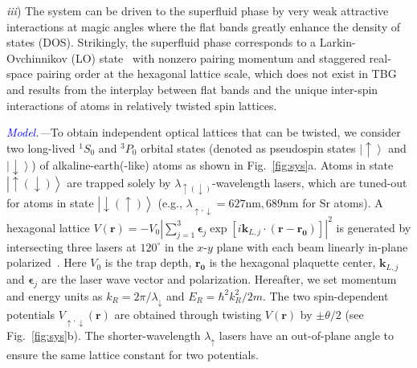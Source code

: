 \documentclass[twocolumn,english,prl,floatfix,citeautoscript,nofootinbib]{revtex4}
\begin{document}
\textit{iii}) The system can be driven to the superfluid phase by very weak
attractive interactions at magic angles where the flat bands greatly enhance
the density of states (DOS). Strikingly, the superfluid phase corresponds to
a Larkin-Ovchinnikov (LO) state~\cite{LO} with nonzero pairing momentum and
staggered real-space pairing order at the hexagonal lattice scale, which
does not exist in TBG and results from the interplay between flat bands and
the unique inter-spin interactions of atoms in relatively twisted spin
lattices.

\emph{\textcolor{blue}{Model}.---}To obtain independent optical lattices
that can be twisted, we consider two long-lived $^{1}S_{0}$ and $^{3}P_{0}$
orbital states (denoted as pseudospin states $\left\vert \uparrow
\right\rangle $ and $\left\vert \downarrow \right\rangle $) of
alkaline-earth(-like) atoms \cite%
{PhysRevA.78.032508,PhysRevLett.101.170504,PhysRevLett.120.143601,PhysRevA.100.053604}
as shown in Fig.~\ref{fig:sys}a. Atoms in state $\left\vert \uparrow
(\downarrow )\right\rangle $ are trapped solely by $\lambda _{\uparrow
(\downarrow )}$-wavelength lasers, which are tuned-out for atoms in state $%
\left\vert \downarrow (\uparrow )\right\rangle $ (e.g., $\lambda _{\uparrow
,\downarrow }=627\text{nm},689\text{nm}$ for Sr atoms). A hexagonal lattice $%
V(\mathbf{r})=-V_{0}|\sum_{j=1}^{3}\mathbf{\epsilon }_{j}\exp [i\mathbf{k}%
_{L,j}\cdot (\mathbf{r}-\mathbf{r_{0}})]|^{2}$ is generated by intersecting
three lasers at $120^{\circ }$ in the $x$-$y$ plane with each beam linearly
in-plane polarized~\cite{science.aad5812}. Here $V_{0}$ is the trap depth, $%
\mathbf{r_{0}}$ is the hexagonal plaquette center, $\mathbf{k}_{L,j}$ and $%
\mathbf{\epsilon }_{j}$ are the laser wave vector and polarization.
Hereafter, we set momentum and energy units as $k_{R}={2\pi }/{\lambda
_{\downarrow }}$ and $E_{R}={\hbar ^{2}k_{R}^{2}}/{2m}$.
The two spin-dependent potentials $V_{\uparrow ,\downarrow }(\mathbf{r})$
are obtained through twisting $V(\mathbf{r})$ by $\pm \theta /2$
(see Fig.~\ref{fig:sys}b). The shorter-wavelength $\lambda _{\uparrow }$ lasers
have an out-of-plane angle to ensure the same lattice constant for two
potentials.
\end{document}
